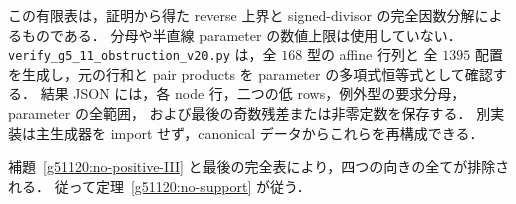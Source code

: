 この有限表は，証明から得た reverse 上界と signed-divisor の完全因数分解によるものである．
分母や半直線 parameter の数値上限は使用していない．
\nolinkurl{verify_g5_11_obstruction_v20.py} は，全 $168$ 型の affine 行列と
全 $1395$ 配置を生成し，元の行和と pair products を parameter の多項式恒等式として確認する．
結果 JSON には，各 node 行，二つの低 rows，例外型の要求分母，parameter の全範囲，
および最後の奇数残差または非零定数を保存する．
別実装は主生成器を import せず，canonical データからこれらを再構成できる．

補題~\ref{g51120:no-positive-III} と最後の完全表により，四つの向きの全てが排除される．
従って定理~\ref{g51120:no-support} が従う．
